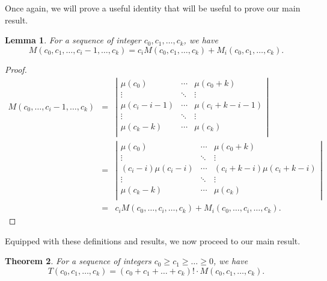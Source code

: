 \documentclass[12pt]{amsart}
\newtheorem{theorem}{Theorem}[section]
\newtheorem{lemma}[theorem]{Lemma}
\newcommand{\ifact}{\mu}
\newcommand{\M}{M}
\begin{document}
Once again, we will prove a useful identity that will be useful to prove our main result.

\begin{lemma}
For a sequence of integer $c_0, c_1, \dots, c_k$, we have
$$
\M(c_0, c_1, \dots, c_i - 1, \dots, c_k) = c_i \M(c_0, c_1, \dots, c_k) + \M_i(c_0, c_1, \dots, c_k).
$$
\label{lem:mimidentity}
\end{lemma}

\begin{proof}
$$\begin{array}{ccl}
 \M(c_0, \dots, c_i - 1, \dots, c_k) & = & \left|
\begin{matrix}
\ifact(c_0) & \cdots & \ifact(c_0+k) \\
\vdots & \ddots & \vdots \\
\ifact(c_i-i-1) & \cdots & \ifact(c_i+k-i-1) \\
\vdots & \ddots & \vdots \\
\ifact(c_k-k) & \cdots & \ifact(c_k) \\
\end{matrix} \right| \\
& = & \left|
\begin{matrix}
\ifact(c_0) & \cdots & \ifact(c_0+k) \\
\vdots & \ddots & \vdots \\
(c_i - i) \ifact(c_i-i) & \cdots & (c_i+k-i) \ifact(c_i+k-i) \\
\vdots & \ddots & \vdots \\
\ifact(c_k-k) & \cdots & \ifact(c_k) \\
\end{matrix} \right| \\
& = & c_i \M(c_0, \dots, c_i, \dots, c_k) + \M_i(c_0, \dots, c_i, \dots, c_k).
\end{array}$$
\end{proof}

\vspace{0.75cm}



Equipped with these definitions and results, we now proceed to our main result.

\begin{theorem}
For a sequence of integers $c_0 \geq c_1 \geq \dots \geq 0$, we have
$$
T(c_0, c_1, \dots, c_k) = (c_0 + c_1 + \dots + c_k)! \cdot \M(c_0, c_1, \dots, c_k).
$$
\label{thm:closedform}
\end{theorem}
\end{document}
